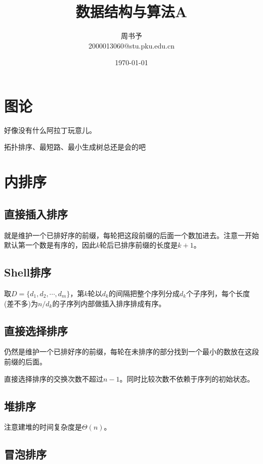 \documentclass[8pt]{article}
\title{\heiti\zihao{1} 数据结构与算法A}
\author{\kaishu\zihao{-3} 周书予\\2000013060@stu.pku.edu.cn}
\date{\today}
\begin{document}
\small
\pagestyle{fancy}
\chead{}


\maketitle

\section{图论}

好像没有什么阿拉丁玩意儿。

拓扑排序、最短路、最小生成树总还是会的吧

\section{内排序}

\subsection{直接插入排序}
就是维护一个已排好序的前缀，每轮把这段前缀的后面一个数加进去。注意一开始默认第一个数是有序的，因此$k$轮后已排序前缀的长度是$k+1$。

\subsection{Shell排序}

取$D = \{d_1, d_2, \cdots, d_m\}$，第$k$轮以$d_k$的间隔把整个序列分成$d_k$个子序列，每个长度(差不多)为$n / d_k$的子序列内部做插入排序排成有序。

\subsection{直接选择排序}
仍然是维护一个已排好序的前缀，每轮在未排序的部分找到一个最小的数放在这段前缀的后面。

直接选择排序的交换次数不超过$n-1$。同时比较次数不依赖于序列的初始状态。


\subsection{堆排序}

注意建堆的时间复杂度是$\Theta(n)$。

\subsection{冒泡排序}
\end{document}
